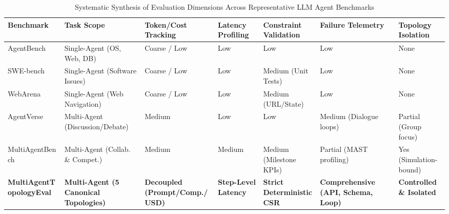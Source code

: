 \begin{table}[t]
\centering
\caption{Systematic Synthesis of Evaluation Dimensions Across Representative LLM Agent Benchmarks}
\label{tab:benchmark_comparison}
\footnotesize
\setlength{\tabcolsep}{2.5pt}
\begin{tabular}{@{}p{3.0cm}p{2.7cm}p{2.4cm}p{1.9cm}p{2.2cm}p{2.4cm}p{1.9cm}@{}}
\hline
\textbf{Benchmark} & \textbf{Task Scope} & \textbf{Token/Cost Tracking} & \textbf{Latency Profiling} & \textbf{Constraint Validation} & \textbf{Failure Telemetry} & \textbf{Topology Isolation} \\ \hline
AgentBench~\cite{Liu2024AgentBench} & Single-Agent (OS, Web, DB) & Coarse / Low & Low & Low & Low & None \\
SWE-bench~\cite{Jimenez2024SWEbench} & Single-Agent (Software Issues) & Coarse / Low & Low & Medium (Unit Tests) & Low & None \\
WebArena~\cite{Zhou2024WebArena} & Single-Agent (Web Navigation) & Coarse / Low & Low & Medium (URL/State) & Low & None \\
AgentVerse~\cite{Chen2024AgentVerse} & Multi-Agent (Discussion/Debate) & Medium & Low & Low & Medium (Dialogue loops) & Partial (Group focus) \\
MultiAgentBench~\cite{Zhu2025MultiAgentBench} & Multi-Agent (Collab. \& Compet.) & Medium & Medium & Medium (Milestone KPIs) & Partial (MAST profiling) & Yes (Simulation-bound) \\ \hline
\textbf{MultiAgent\-TopologyEval} & \textbf{Multi-Agent (5 Canonical Topologies)} & \textbf{Decoupled (Prompt/Comp./USD)} & \textbf{Step-Level Latency} & \textbf{Strict Deterministic CSR} & \textbf{Comprehensive (API, Schema, Loop)} & \textbf{Controlled \& Isolated} \\ \hline
\end{tabular}
\end{table}


